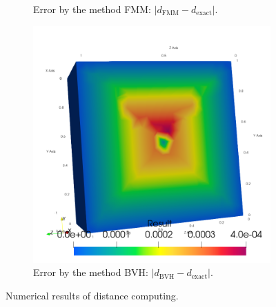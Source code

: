 \begin{figure}
\begin{subfigure}{0.33\textwidth}
        \caption{Error by the method FMM: $|d_\mathrm{FMM}-d_\mathrm{exact}|$.}
        \label{fig:specs:app-feelpp-distance:results:error-fmm}
    \end{subfigure}
    \begin{subfigure}{0.33\textwidth}
        \centering
        \includegraphics[width=\columnwidth]{graphics/feelpp/feelpp-benchmark-distance-errorBVH}
        \caption{Error by the method BVH: $|d_\mathrm{BVH}-d_\mathrm{exact}|$.}
        \label{fig:specs:app-feelpp-distance:results:error-bvh}
    \end{subfigure}
    \caption{Numerical results of distance computing.}
    \label{fig:specs:app-feelpp-distance:results}
\end{figure}
